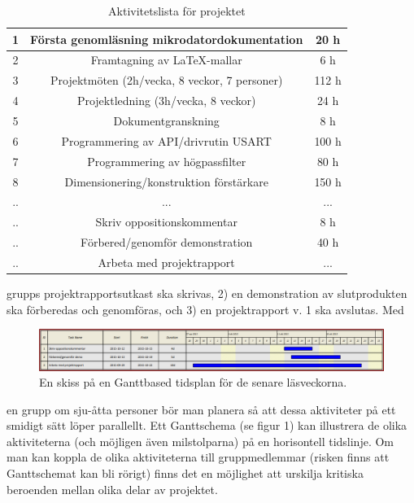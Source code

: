 \documentclass{article}
\begin{document}
\begin{table}[!h]
\begin{center}
\begin{tabular}{ |c|c|c| } 
\hline
1 & Första genomläsning mikrodatordokumentation & 20 h\\ 
\hline
2 & Framtagning av LaTeX-mallar & 6 h \\ 
\hline
3 & Projektmöten (2h/vecka, 8 veckor, 7 personer)  & 112 h \\ 
\hline
4 & Projektledning (3h/vecka, 8 veckor) & 24 h \\ 
\hline
5 & Dokumentgranskning & 8 h \\
\hline
6 & Programmering av API/drivrutin USART & 100 h\\ 
\hline
7 & Programmering av högpassfilter & 80 h \\ 
\hline
8 & Dimensionering/konstruktion förstärkare & 150 h \\ 
\hline
.. & ... & ... \\ 
\hline
.. & Skriv oppositionskommentar & 8 h \\ 
\hline
.. & Förbered/genomför demonstration & 40 h \\
\hline
.. & Arbeta med projektrapport & ... \\ 
\hline
\end{tabular}
\caption{Aktivitetslista för projektet}
\label{table2}
\end{center}
\end{table}
grupps projektrapportsutkast ska skrivas, 2) en demonstration av slutprodukten
ska förberedas och genomföras, och 3) en projektrapport v. 1 ska avslutas. Med

\begin{figure}
    \centering
    \includegraphics[width=\textwidth]{table.png}
    \caption{En skiss på en Ganttbased tidsplan för de senare läsveckorna.}
\end{figure}

en grupp om sju-åtta personer bör man planera så att dessa aktiviteter på ett
smidigt sätt löper parallellt. Ett Ganttschema (se figur 1) kan illustrera de olika
aktiviteterna (och möjligen även milstolparna) på en horisontell tidslinje.
Om man kan koppla de olika aktiviteterna till gruppmedlemmar (risken finns
att Ganttschemat kan bli rörigt) finns det en möjlighet att urskilja kritiska
beroenden mellan olika delar av projektet.
\end{document}
